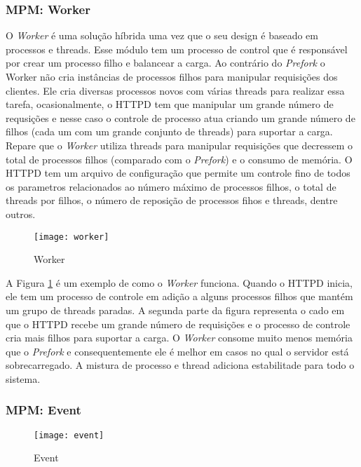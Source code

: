 \subsubsection{MPM: Worker}

O \textit{Worker} é uma solução híbrida uma vez que o seu design é baseado em processos e threads. Esse módulo tem um processo de control que é responsável por crear um processo filho e balancear a carga. Ao contrário do \textit{Prefork} o Worker não cria instâncias de processos filhos para manipular requisições dos clientes. Ele cria diversas processos novos com várias threads para realizar essa tarefa, ocasionalmente, o HTTPD tem que manipular um grande número de requsições e nesse caso o controle de processo atua criando um grande número de filhos (cada um com um grande conjunto de threads) para suportar a carga. Repare que o \textit{Worker} utiliza threads para manipular requisições que decressem o total de processos filhos (comparado com o \textit{Prefork}) e o consumo de memória. O HTTPD tem um arquivo de configuração que permite um controle fino de todos os parametros relacionados ao número máximo de processos filhos, o total de threads por filhos, o número de reposição de processos fihos e threads, dentre outros.

\begin{figure}[!h]
  \centering
  \texttt{[image: worker]} 
  \caption{Worker}
  \label{fig:worker} 
\end{figure}

A Figura \ref{fig:worker} é um exemplo de como o \textit{Worker} funciona. Quando o HTTPD inicia, ele tem um processo de controle em adição a alguns processos filhos que mantém um grupo de threads paradas. A segunda parte da figura representa o cado em que o HTTPD recebe um grande número de requisições e o processo de controle cria mais filhos para suportar a carga. O \textit{Worker} consome muito menos memória que o \textit{Prefork} e consequentemente ele é melhor em casos no qual o servidor está sobrecarregado. A mistura de processo e thread adiciona estabilitade para todo o sistema.

\subsubsection{MPM: Event}

\begin{figure}[!h]
  \centering
  \texttt{[image: event]} 
  \caption{Event}
  \label{fig:event} 
\end{figure}


